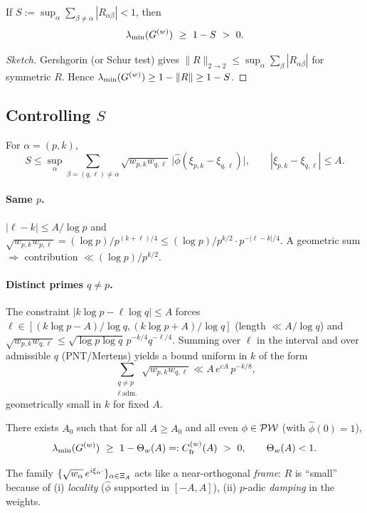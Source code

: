 \documentclass[11pt,a4paper]{proofarticle}
\begin{document}
\begin{lemma}\label{lem:gershgorin}
If $S:=\sup_{\alpha}\sum_{\beta\ne\alpha}|R_{\alpha\beta}|<1$, then
\[
\lambda_{\min}(\Gpw)\ \ge\ 1-S\ >\ 0.
\]
\end{lemma}

\begin{proof}[Sketch]
Gershgorin (or Schur test) gives $\|R\|_{2\to 2}\le \sup_\alpha\sum_\beta|R_{\alpha\beta}|$ for symmetric $R$.
Hence $\lambda_{\min}(G^{(w)})\ge 1-\|R\|\ge 1-S$.
\end{proof}

\subsection{\texorpdfstring{Controlling $S$}{Controlling S}}
For $\alpha=(p,k)$,
\[
S\le \sup_\alpha \sum_{\beta=(q,\ell)\ne\alpha}\sqrt{w_{p,k}w_{q,\ell}}\,\big|\widehat\phi(\xi_{p,k}-\xi_{q,\ell})\big|,
\qquad
|\xi_{p,k}-\xi_{q,\ell}|\le A.
\]
\paragraph{Same $p$.} $|\ell-k|\le A/\log p$ and
$\sqrt{w_{p,k}w_{p,\ell}}=(\log p)/p^{(k+\ell)/4}\le (\log p)/p^{k/2}\cdot p^{-|\ell-k|/4}$.
A geometric sum $\Rightarrow$ contribution $\ll (\log p)/p^{k/2}$.

\paragraph{Distinct primes $q\ne p$.}
The constraint $|k\log p-\ell\log q|\le A$ forces $\ell\in [(k\log p-A)/\log q,(k\log p+A)/\log q]$ (length $\ll A/\log q$)
and $\sqrt{w_{p,k}w_{q,\ell}}\le \sqrt{\log p\log q}\,p^{-k/4}q^{-\ell/4}$. Summing over $\ell$ in the interval and over
admissible $q$ (PNT/Mertens) yields a bound uniform in $k$ of the form
\[
\sum_{\substack{q\ne p\\ \ell\ \text{adm.}}}\sqrt{w_{p,k}w_{q,\ell}}\ll A\,e^{cA}\,p^{-k/8},
\]
geometrically small in $k$ for fixed $A$.

\begin{proposition}\label{prop:T2}
There exists $A_0$ such that for all $A\ge A_0$ and all even $\phi\in\mathcal{PW}$ (with $\widehat\phi(0)=1$),
\[
\lambda_{\min}(\Gpw)\ \ge\ 1-\Thetaw(A)=:\Cfrw(A)\ >\ 0,\qquad \Thetaw(A)<1.
\]
\end{proposition}

\begin{remark}
The family $\{\sqrt{w_\alpha}\,e^{i\xi_\alpha\cdot}\}_{\alpha\in\Xi_A}$ acts like a near-orthogonal \emph{frame}:
$R$ is “small” because of (i) \emph{locality} ($\widehat\phi$ supported in $[-A,A]$), (ii) $p$-adic \emph{damping} in the weights.
\end{remark}
\end{document}
